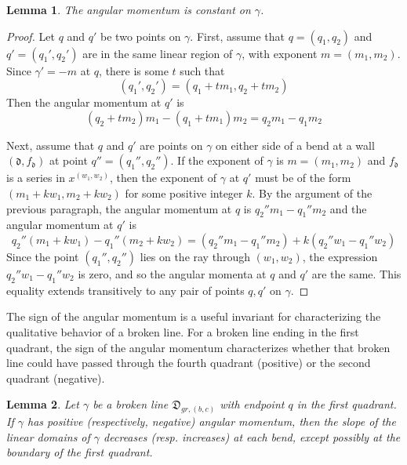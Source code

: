 \documentclass[10pt]{amsart}
\newtheorem{lemma}{Lemma}[section]
\theoremstyle{remark}
\numberwithin{equation}{section}
\newcommand{\fd}{\mathfrak{d}}
\begin{document}
\begin{lemma}
The angular momentum is constant on $\gamma$.
\end{lemma}
\begin{proof}
Let $q$ and $q'$ be two points on $\gamma$.
First, assume that $q=(q_1,q_2)$ and $q'=(q_1',q_2')$ are in the same linear region of $\gamma$, with exponent $m=(m_1,m_2)$.  Since $\gamma'=-m$ at $q$, there is some $t$ such that 
\[ (q_1',q_2') = (q_1+tm_1,q_2+tm_2) \]
Then the angular momentum at $q'$ is 
\[ (q_2+tm_2)m_1-(q_1+tm_1)m_2 = q_2m_1 - q_1m_2 \]

Next, assume that $q$ and $q'$ are points on $\gamma$ on either side of a bend at a wall $(\fd, f_{\fd})$ at point $q''=(q_1'',q_2'')$.  If the exponent of $\gamma$ is $m=(m_1,m_2)$ and $f_{\fd}$ is a series in $x^{(w_1,w_2)}$, then the exponent of $\gamma$ at $q'$ must be of the form $(m_1+kw_1,m_2+kw_2)$ for some positive integer $k$.  By the argument of the previous paragraph, the angular momentum at $q$ is $q_2''m_1-q_1''m_2$
and the angular momentum at $q'$ is
\[ q_2''(m_1+kw_1)-q_1''(m_2+kw_2) = (q_2''m_1-q_1''m_2)+k(q_2''w_1-q_1''w_2) \]
Since the point $(q_1'',q_2'')$ lies on the ray through $(w_1,w_2)$, the expression $q_2''w_1-q_1''w_2$ is zero, and so the angular momenta at $q$ and $q'$ are the same.  This equality extends transitively to any pair of points $q,q'$ on $\gamma$.
\end{proof}
The sign of the angular momentum is a useful invariant for characterizing the qualitative behavior of a broken line.
For a broken line ending in the first quadrant, the sign of the angular momentum characterizes whether that broken line could have passed through the fourth quadrant (positive) or the second quadrant (negative).

\begin{lemma}
Let $\gamma$ be a broken line $\mathfrak{D}_{gr,(b,c)}$ with endpoint $q$ in the first quadrant. If $\gamma$ has positive (respectively, negative) angular momentum, then the slope of the linear domains of $\gamma$ decreases (resp. increases) at each bend, except possibly at the boundary of the first quadrant. 
\end{lemma}
\end{document}

